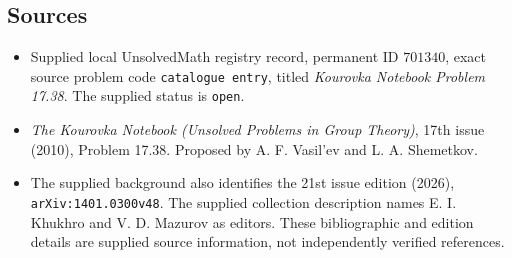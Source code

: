 \documentclass[11pt]{article}
\begin{document}
\subsection{Sources}
\begin{itemize}
\item Supplied local UnsolvedMath registry record, permanent ID \(701340\), exact source problem code \texttt{catalogue entry}, titled \emph{Kourovka Notebook Problem 17.38}. The supplied status is \texttt{open}.
\item \emph{The Kourovka Notebook (Unsolved Problems in Group Theory)}, 17th issue (2010), Problem 17.38. Proposed by A. F. Vasil'ev and L. A. Shemetkov.
\item The supplied background also identifies the 21st issue edition (2026), \texttt{arXiv:1401.0300v48}. The supplied collection description names E. I. Khukhro and V. D. Mazurov as editors. These bibliographic and edition details are supplied source information, not independently verified references.
\end{itemize}
\end{document}
